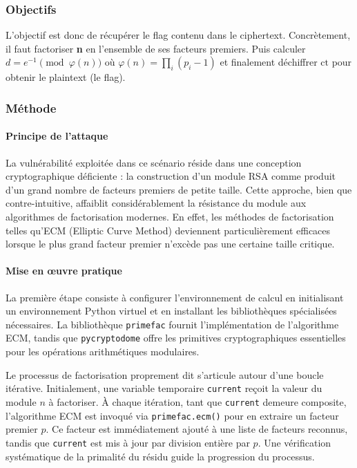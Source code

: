     \subsubsection{Objectifs}
    L'objectif est donc de récupérer le flag contenu dans le ciphertext. Concrètement, il faut factoriser \textbf{n} en l'ensemble de ses facteurs premiers. Puis calculer $d = e^{-1} \pmod{\varphi(n)}$ où $\varphi(n)=\prod_i (p_i-1)$ et finalement déchiffrer $\mathrm{ct}$ pour obtenir le plaintext (le flag). 
    
    \subsubsection{Méthode}
    \paragraph{Principe de l'attaque}
    La vulnérabilité exploitée dans ce scénario réside dans une conception cryptographique déficiente : la construction d'un module RSA comme produit d'un grand nombre de facteurs premiers de petite taille. Cette approche, bien que contre-intuitive, affaiblit considérablement la résistance du module aux algorithmes de factorisation modernes. En effet, les méthodes de factorisation telles qu'ECM (Elliptic Curve Method) deviennent particulièrement efficaces lorsque le plus grand facteur premier n'excède pas une certaine taille critique.
    
    \paragraph{Mise en œuvre pratique}
    La première étape consiste à configurer l'environnement de calcul en initialisant un environnement Python virtuel et en installant les bibliothèques spécialisées nécessaires. La bibliothèque \texttt{primefac} fournit l'implémentation de l'algorithme ECM, tandis que \texttt{pycryptodome} offre les primitives cryptographiques essentielles pour les opérations arithmétiques modulaires.
    
    Le processus de factorisation proprement dit s'articule autour d'une boucle itérative. Initialement, une variable temporaire \texttt{current} reçoit la valeur du module $n$ à factoriser. À chaque itération, tant que \texttt{current} demeure composite, l'algorithme ECM est invoqué via \texttt{primefac.ecm()} pour en extraire un facteur premier $p$. Ce facteur est immédiatement ajouté à une liste de facteurs reconnus, tandis que \texttt{current} est mis à jour par division entière par $p$. Une vérification systématique de la primalité du résidu guide la progression du processus.
    
